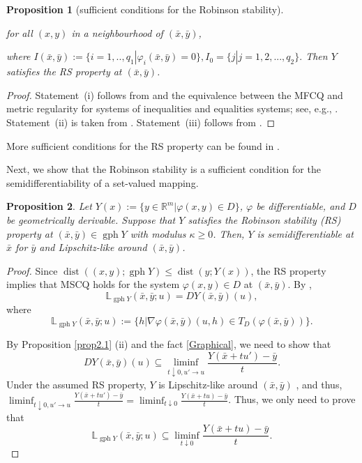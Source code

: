 \documentclass[11pt]{article}
\numberwithin{equation}{section}
\newtheorem{proposition}{Proposition}[section]
\begin{document}
{\begin{proposition}[sufficient conditions for the Robinson stability]
\begin{itemize}
{for all $(x,y)$ in a neighbourhood of $(\bar x,\bar y)$,}
\end{itemize}  where $I(\bar x,\bar y):=\{i=1,..,q_1 | \varphi_i(\bar x,\bar y)=0\}, I_0 = \{j | j = 1,2,...,q_2\}.$
Then $Y$ satisfies the RS property at $(\bar x,\bar y)$. 
\end{proposition}
\begin{proof}
Statement~(i) follows from \cite[Corollary 3.7]{Gfrerer2017} and the equivalence between the MFCQ and metric regularity for systems of inequalities and equalities systems; see, e.g., \cite[Theorem 4.1]{Dontchev2006}. Statement~(ii) is taken from \cite[Proposition 3.2]{BaiYe2023}. Statement~(iii) follows from \cite[Theorem 4.2]{Bednarczuk2020}.
\end{proof}

More sufficient conditions for the RS property can be found in \cite{Bednarczuk2020,Mehlitz2022,Minchenko2011}.



Next, we show that the Robinson stability is a sufficient condition for the semidifferentiability of a set-valued mapping.

\begin{proposition}\label{prop2.2}
Let $Y(x):= \{ y\in \mathbb{R}^m | \varphi (x,y) \in D\}$, $\varphi$ be differentiable, and $D$ be geometrically derivable. Suppose that $Y$ satisfies the Robinson stability (RS) property at $(\bar x,\bar y) \in \operatorname{gph}{Y}$ with modulus $\kappa \geq 0$.
 Then, $Y$ is semidifferentiable at $\bar x$ for $\bar y$ and Lipschitz-like around $(\bar x,\bar y)$.
\end{proposition}
\begin{proof}
Since $\operatorname{dist}((x,y); \operatorname{gph}Y) \leq \operatorname{dist}(y; Y(x))$, the RS property implies that MSCQ holds for the system $\varphi(x,y)\in D$ at $(\bar x,\bar y)$. By \cite[Proposition 4.2]{ABM21},
$$\mathbb{L}_{\operatorname{gph} Y}(\bar x,\bar y;u) = D Y(\bar x,\bar y)(u),$$
where
$$\mathbb{L}_{\operatorname{gph} Y}(\bar x,\bar y;u):=\{h|\nabla \varphi(\bar x,\bar y)(u,h) \in T_D(\varphi(\bar x,\bar y))\}.$$

By Proposition \ref{prop2.1} (ii) and the fact \eqref{Graphical}, we need to show that $$D Y(\bar x,\bar y)(u) \subseteq \liminf_{t\downarrow 0,u' \to u} \frac{Y(\bar x+tu')-\bar y}{t}.$$ Under the assumed RS property, $Y$ is Lipschitz-like around $(\bar x,\bar y)$ \cite[Theorem 5.1]{Gfrerer2017}, and thus, $\liminf_{t\downarrow 0,u' \to u} \frac{Y(\bar x+tu')-\bar y}{t}= \liminf_{t\downarrow 0} \frac{Y(\bar x+tu)-\bar y}{t} $. Thus, we only need to prove that $$\mathbb{L}_{\operatorname{gph} Y}(\bar x,\bar y;u) \subseteq \liminf_{t\downarrow 0} \frac{Y(\bar x+tu)-\bar y}{t}.$$


\end{proof}}
\end{document}
